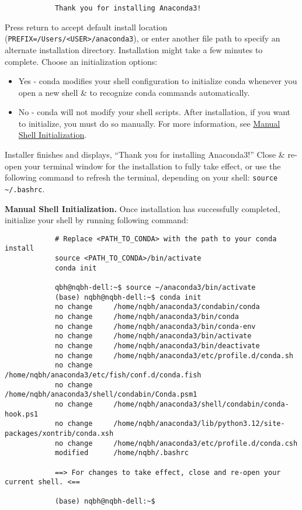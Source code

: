 \documentclass{article}
\begin{document}
\begin{itemize}
\begin{itemize}
\begin{verbatim}
			Thank you for installing Anaconda3!
		\end{verbatim}
		Press return to accept default install location (\verb|PREFIX=/Users/<USER>/anaconda3|), or enter another file path to specify an alternate installation directory. Installation might take a few minutes to complete. Choose an initialization options:
		\begin{itemize}
			\item Yes - conda modifies your shell configuration to initialize conda whenever you open a new shell \& to recognize conda commands automatically.
			\item No - conda will not modify your shell scripts. After installation, if you want to initialize, you must do so manually. For more information, see \href{https://docs.anaconda.com/anaconda/install/#manual-shell-init-linux}{Manual Shell Initialization}.
		\end{itemize}
		Installer finishes and displays, ``Thank you for installing Anaconda3!'' Close \& re-open your terminal window for the installation to fully take effect, or use the following command to refresh the terminal, depending on your shell: \verb|source ~/.bashrc|.
		
		{\bf Manual Shell Initialization.} Once installation has successfully completed, initialize your shell by running following command:
		\begin{verbatim}
			# Replace <PATH_TO_CONDA> with the path to your conda install
			source <PATH_TO_CONDA>/bin/activate
			conda init
			
			qbh@nqbh-dell:~$ source ~/anaconda3/bin/activate 
			(base) nqbh@nqbh-dell:~$ conda init
			no change     /home/nqbh/anaconda3/condabin/conda
			no change     /home/nqbh/anaconda3/bin/conda
			no change     /home/nqbh/anaconda3/bin/conda-env
			no change     /home/nqbh/anaconda3/bin/activate
			no change     /home/nqbh/anaconda3/bin/deactivate
			no change     /home/nqbh/anaconda3/etc/profile.d/conda.sh
			no change     /home/nqbh/anaconda3/etc/fish/conf.d/conda.fish
			no change     /home/nqbh/anaconda3/shell/condabin/Conda.psm1
			no change     /home/nqbh/anaconda3/shell/condabin/conda-hook.ps1
			no change     /home/nqbh/anaconda3/lib/python3.12/site-packages/xontrib/conda.xsh
			no change     /home/nqbh/anaconda3/etc/profile.d/conda.csh
			modified      /home/nqbh/.bashrc
			
			==> For changes to take effect, close and re-open your current shell. <==
			
			(base) nqbh@nqbh-dell:~$
		\end{verbatim}
		

\end{itemize}
\end{itemize}
\end{document}
